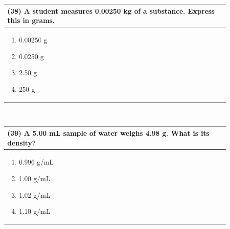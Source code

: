 \documentclass{article}
\begin{document}
\vspace{0.5cm}
\noindent \begin{tabular}{|p{0.9\linewidth}|}
\hline
\vspace{0.2cm}
\textbf{(38)} A student measures 0.00250 kg of a substance. Express this in grams.\\
\hline
\vspace{0.2cm}
\begin{minipage}[t]{0.85\linewidth}
\begin{enumerate}[label=\alph*.]
\item 0.00250 g
\item 0.0250 g
\item 2.50 g
\item 250 g
\end{enumerate}
\end{minipage}\\
\hline
\end{tabular}
\\

\vspace{0.5cm}
\noindent \begin{tabular}{|p{0.9\linewidth}|}
\hline
\vspace{0.2cm}
\textbf{(39)} A 5.00 mL sample of water weighs 4.98 g. What is its density?\\
\hline
\vspace{0.2cm}
\begin{minipage}[t]{0.85\linewidth}
\begin{enumerate}[label=\alph*.]
\item 0.996 g/mL
\item 1.00 g/mL
\item 1.02 g/mL
\item 1.10 g/mL
\end{enumerate}
\end{minipage}\\
\hline
\end{tabular}
\\
\end{document}
